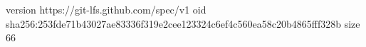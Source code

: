 version https://git-lfs.github.com/spec/v1
oid sha256:253fde71b43027ae83336f319e2cee123324c6ef4c560ea58c20b4865fff328b
size 66

